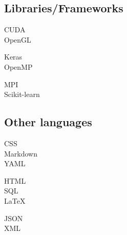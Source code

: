 \documentclass[curriculum-vitae-eng]{subfiles}
\begin{document}
		\subsection*{Libraries/Frameworks}
			\begin{minipage}[t]{.3\textwidth}
				CUDA \hfill {}\\
				OpenGL \hfill {}\\
			\end{minipage}
			\hfill
			\begin{minipage}[t]{.3\textwidth}
				Keras \hfill {}\\
				OpenMP \hfill {}\\
			\end{minipage}
			\hfill
			\begin{minipage}[t]{.3\textwidth}
				MPI \hfill {}\\
				Scikit-learn \hfill {}\\
			\end{minipage}
		
		\subsection*{Other languages}
			\begin{minipage}[t]{.3\textwidth}
				CSS \hfill {}\\
				Markdown \hfill {}\\
				YAML \hfill {}\\
			\end{minipage}
			\hfill
			\begin{minipage}[t]{.3\textwidth}
				HTML \hfill {}\\
				SQL \hfill {}\\
				\LaTeX \hfill {}\\
			\end{minipage}
			\hfill
			\begin{minipage}[t]{.3\textwidth}
				JSON \hfill {}\\
				XML \hfill {}\\
			\end{minipage}
		
\end{document}
